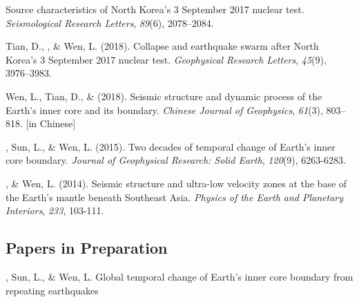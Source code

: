 \begin{etaremune}
	Source characteristics of North Korea's 3 September 2017 nuclear test.
    \textit{Seismological Research Letters}, \textit{89}(6), 2078--2084.
\item
    Tian, D., \Yao\CF, \& Wen, L. (2018).
    Collapse and earthquake swarm after North Korea's 3 September 2017 nuclear test.
    \textit{Geophysical Research Letters}, \textit{45}(9), 3976--3983.
\item
    Wen, L., Tian, D., \& \Yao (2018).
    Seismic structure and dynamic process of the Earth's inner core and its boundary.
    \textit{Chinese Journal of Geophysics}, \textit{61}(3), 803--818.
     [in Chinese]
\item
    \Yao, Sun, L., \& Wen, L. (2015).
    Two decades of temporal change of Earth's inner core boundary.
    \textit{Journal of Geophysical Research: Solid Earth}, \textit{120}(9), 6263-6283.
\item
    \Yao, \& Wen, L. (2014).
    Seismic structure and ultra-low velocity zones at the base of the Earth's mantle beneath Southeast Asia.
    \textit{Physics of the Earth and Planetary Interiors}, \textit{233}, 103-111.
\end{etaremune}


\subsection*{Papers in Preparation}
\begin{etaremune}
\item
    \Yao, Sun, L., \& Wen, L.
    Global temporal change of Earth’s inner core boundary from repeating earthquakes
\end{etaremune}
